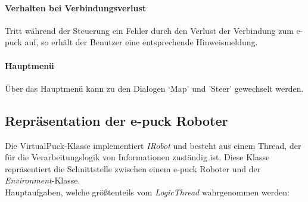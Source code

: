 \documentclass[10pt,a4paper]{article}
\begin{document}
	\paragraph*{Verhalten bei Verbindungsverlust} Tritt während der Steuerung ein Fehler durch den Verlust der Verbindung zum e-puck auf, so erhält
	 der Benutzer eine entsprechende Hinweismeldung.
	
	\paragraph*{Hauptmenü} Über das Hauptmenü kann zu den Dialogen `Map' und 'Steer' gewechselt werden.        
      		
      \subsection{Repräsentation der e-puck Roboter}
      	\label{sec:repraesentation}
		Die VirtualPuck-Klasse implementiert \textit{IRobot} und besteht aus einem Thread, der für die Verarbeitungslogik von
		Informationen zuständig ist. Diese Klasse repräsentiert die Schnittstelle zwischen einem e-puck Roboter und der
		\textit{Environment}-Klasse. \\
		Hauptaufgaben, welche größtenteils vom \textit{LogicThread} wahrgenommen werden:
\end{document}
